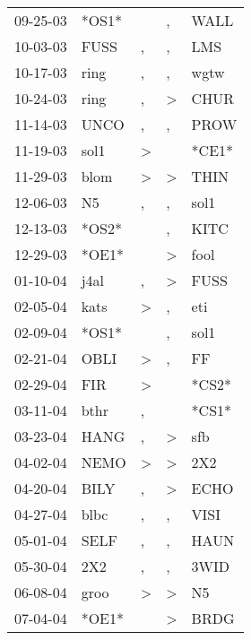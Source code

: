 \begin{supertabular}{lllll}
 09-25-03 &  *OS1* &                  &                , &   WALL \\
 10-03-03 &   FUSS &                , &                , &    LMS \\
 10-17-03 &   ring &                , &                , &   wgtw \\
 10-24-03 &   ring &                , &     \textgreater &   CHUR \\
 11-14-03 &   UNCO &                , &                , &   PROW \\
 11-19-03 &   sol1 &     \textgreater &                  &  *CE1* \\
 11-29-03 &   blom &     \textgreater &     \textgreater &   THIN \\
 12-06-03 &     N5 &                , &                , &   sol1 \\
 12-13-03 &  *OS2* &                  &                , &   KITC \\
 12-29-03 &  *OE1* &                  &     \textgreater &   fool \\
 01-10-04 &   j4al &                , &     \textgreater &   FUSS \\
 02-05-04 &   kats &     \textgreater &                , &    eti \\
 02-09-04 &  *OS1* &                  &                , &   sol1 \\
 02-21-04 &   OBLI &     \textgreater &                , &     FF \\
 02-29-04 &    FIR &     \textgreater &                  &  *CS2* \\
 03-11-04 &   bthr &                , &                  &  *CS1* \\
 03-23-04 &   HANG &                , &     \textgreater &    sfb \\
 04-02-04 &   NEMO &     \textgreater &     \textgreater &    2X2 \\
 04-20-04 &   BILY &                , &     \textgreater &   ECHO \\
 04-27-04 &   blbc &                , &                , &   VISI \\
 05-01-04 &   SELF &                , &                , &   HAUN \\
 05-30-04 &    2X2 &                , &                , &   3WID \\
 06-08-04 &   groo &     \textgreater &     \textgreater &     N5 \\
 07-04-04 &  *OE1* &                  &     \textgreater &   BRDG \\

\end{supertabular}
